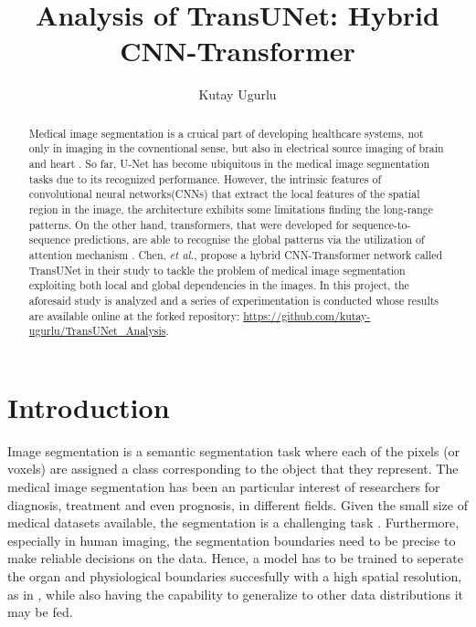 \documentclass{IEEEtran}
\date{}
\title{Analysis of TransUNet: Hybrid CNN-Transformer}
\author{Kutay Ugurlu}
\begin{document}
\maketitle
\nopagebreak
\onecolumn{
\tableofcontents
\listoffigures
\listoftables
}
\twocolumn
\maketitle
\begin{abstract}
    Medical image segmentation is a cruical part of developing healthcare systems, not only in imaging in the covnentional sense, but also in electrical source imaging of brain and heart \cite{gonzalez2020ecgi}. So far, U-Net\cite[text]{ronneberger2015u} has become ubiquitous in the medical image segmentation tasks due to its recognized performance. However, the intrinsic features of convolutional neural networks(CNNs) that extract the local features of the spatial region in the image, the architecture exhibits some limitations finding the long-range patterns. On the other hand, transformers, that were developed for sequence-to-sequence predictions, are able to recognise the global patterns via the utilization of attention mechanism \cite{vaswani2017attention}. Chen, \textit{et al.}, propose a hybrid CNN-Transformer network called TransUNet in their study  \cite{chen2021transunet} to tackle the problem of medical image segmentation exploiting both local and global dependencies in the images.
    In this project, the aforesaid study is analyzed and a series of experimentation is conducted whose results are available online at the forked repository: \href{https://github.com/kutay-ugurlu/TransUNet_Analysis}{https://github.com/kutay-ugurlu/TransUNet\_Analysis}. 
\end{abstract}
\section{Introduction}

Image segmentation is a semantic segmentation task where each of the pixels (or voxels) are assigned a class corresponding to the object that they represent. The medical image segmentation has been an particular interest of researchers for diagnosis, treatment and even prognosis, in different fields. Given the small size of medical datasets available, the segmentation is a challenging task \cite{ren2019brain}. Furthermore, especially in human imaging, the segmentation boundaries need to be precise to make reliable decisions on the data. Hence, a model has to be trained to seperate the organ and physiological boundaries succesfully with a high spatial resolution, as in , while also having the capability to generalize to other data distributions it may be fed. 
\end{document}
